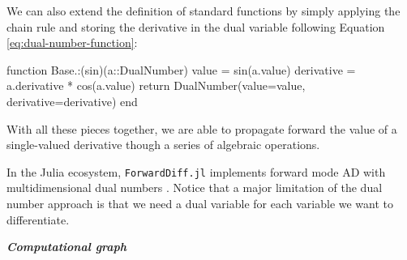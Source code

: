 We can also extend the definition of standard functions by simply applying the chain rule and storing the derivative in the dual variable following Equation \eqref{eq:dual-number-function}:
\begin{jllisting}
function Base.:(sin)(a::DualNumber)
    value = sin(a.value)
    derivative = a.derivative * cos(a.value)
    return DualNumber(value=value, derivative=derivative)
end
\end{jllisting}
With all these pieces together, we are able to propagate forward the value of a single-valued derivative though a series of algebraic operations. 

In the Julia ecosystem, \texttt{ForwardDiff.jl} implements forward mode AD with multidimensional dual numbers \cite{RevelsLubinPapamarkou2016}. 
Notice that a major limitation of the dual number approach is that we need a dual variable for each variable we want to differentiate. 

\vspace*{10px}
\noindent \textbf{\textit{Computational graph}}
\vspace*{5px}

